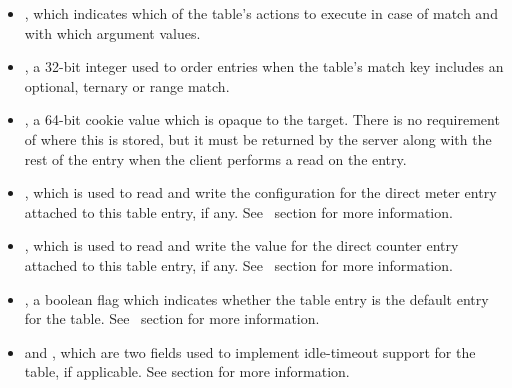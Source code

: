 \documentclass[11pt]{article}
\begin{document}
{\begin{itemize}
\item{}
, which indicates which of the table's actions to execute in case of
match and with which argument values.%

\item{}
, a 32-bit integer used to order entries when the table's match key
includes an optional, ternary or range match.%

\item{}
, a 64-bit cookie value which is opaque to the
target. There is no requirement of where this is stored, but it must be
returned by the server along with the rest of the entry when the client
performs a read on the entry.%

\item{}
, which is used to read and write the configuration for the
direct meter entry attached to this table entry, if any. See~ section for more information.%

\item{}
, which is used to read and write the value for the direct
counter entry attached to this table entry, if any. See~ section for more information.%

\item{}
, a boolean flag which indicates whether the table entry is
the default entry for the table. See~
section for more information.%

\item{}
 and , which are two fields used to
implement idle-timeout support for the table, if applicable. See
 section for more information.%
\end{itemize}%

}
\end{document}
